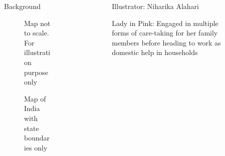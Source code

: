 \documentclass[final]{beamer}
\newlength{\sepwidth}
\newlength{\colwidth}
\newcommand{\separatorcolumn}{\begin{column}{\sepwidth}\end{column}}
\begin{document}
\begin{frame}[t]
\begin{columns}[t]
\begin{column}{\colwidth}
\begin{block}{Background}
\begin{figure}
%
                {Map not to scale. For illustration purpose only}
\caption{Map of India with state boundaries only}
\end{figure}
  \end{block}
\end{column}

\separatorcolumn

\begin{column}{\colwidth}

\begin{figure}
%
                  {Illustrator: Niharika Alahari}
      \vspace{-1.2cm}  
\caption{Lady in Pink: Engaged in multiple forms of care-taking for her family members
before heading to work as domestic help in households}
\end{figure}


\end{column}
\end{columns}
\end{frame}
\end{document}
